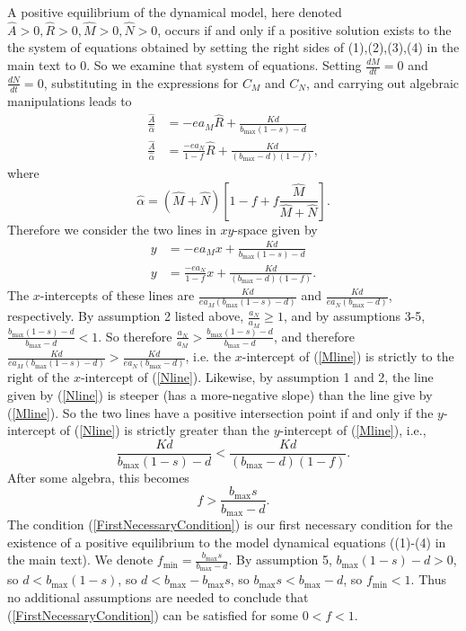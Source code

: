 \documentclass[letterpaper,11pt]{article}
\newcommand{\hA}{\hat{A}}
\newcommand{\hR}{\hat{R}}
\newcommand{\hM}{\hat{M}}
\newcommand{\hN}{\hat{N}}
\newcommand{\halph}{\hat{\alpha}}
\newcommand{\bmax}{b_{\text{max}}}
\newcommand{\fmin}{f_{\text{min}}}
\begin{document}
\noindent A positive equilibrium of the dynamical model, here denoted $\hA>0,\hR>0,\hM>0,\hN>0$, occurs if and only if
a positive solution exists to the the system of equations obtained by setting the right sides of (1),(2),(3),(4)
in the main text to $0$. So we examine that system of equations. 
Setting $\frac{dM}{dt}=0$ and $\frac{dN}{dt}=0$, substituting in the expressions for $C_M$ and $C_N$, and carrying out
algebraic manipulations leads to
\begin{align}
\frac{\hA}{\halph} &= -ea_M \hR +\frac{Kd}{\bmax (1-s)-d} \\
\frac{\hA}{\halph} &= \frac{-ea_N}{1-f}\hR +\frac{Kd}{(\bmax-d)(1-f)},
\end{align}
where
\begin{equation}
\halph=(\hM+\hN)\left[1-f+f\frac{\hM}{\hM+\hN} \right].
\end{equation}
Therefore we consider the two lines in $xy$-space given by
\begin{align}
y &= -ea_M x +\frac{Kd}{\bmax (1-s)-d} \label{Mline}\\
y &= \frac{-ea_N}{1-f}x +\frac{Kd}{(\bmax-d)(1-f)}. \label{Nline}
\end{align}
The $x$-intercepts of these lines are $\frac{Kd}{ea_M(\bmax(1-s)-d)}$ and
$\frac{Kd}{ea_N(\bmax-d)}$, respectively. By assumption 2 listed above, $\frac{a_N}{a_M}\geq1$, and by assumptions 3-5,
$\frac{\bmax(1-s)-d}{\bmax-d}<1$. So therefore $\frac{a_N}{a_M}>\frac{\bmax(1-s)-d}{\bmax-d}$, and
therefore $\frac{Kd}{ea_M(\bmax(1-s)-d)}>\frac{Kd}{ea_N(\bmax-d)}$, i.e. the $x$-intercept of (\ref{Mline})
is strictly to the right of the $x$-intercept of (\ref{Nline}). Likewise, by assumption 1 and 2, the line given by
(\ref{Nline}) is steeper (has a more-negative slope) than the line give by (\ref{Mline}). So the two lines have a
positive intersection point if and only if the $y$-intercept of (\ref{Nline}) is strictly greater than the
$y$-intercept of (\ref{Mline}), i.e.,
\begin{equation}
\frac{Kd}{\bmax(1-s)-d}<\frac{Kd}{(\bmax-d)(1-f)}.
\end{equation}
After some algebra, this becomes
\begin{equation}
f>\frac{\bmax s}{\bmax-d}.\label{FirstNecessaryCondition}
\end{equation}
The condition (\ref{FirstNecessaryCondition}) is our first necessary condition for the existence of a positive equilibrium to
the model dynamical equations ((1)-(4) in the main text). We denote $\fmin=\frac{\bmax s}{\bmax-d}$. By assumption 5,
$\bmax(1-s)-d>0$, so $d<\bmax(1-s)$, so $d<\bmax-\bmax s$, so $\bmax s < \bmax - d$, so $\fmin<1$. Thus no additional assumptions
are needed to conclude that (\ref{FirstNecessaryCondition}) can be satisfied for some $0<f<1$.
\end{document}

